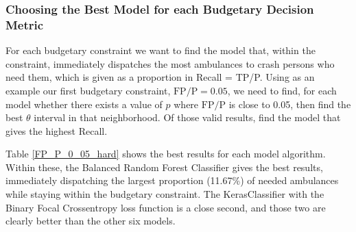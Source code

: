 \begin{comment}
Method 2:  This method is worked out in the 

\verb|RFC_Hard_0_Slices_Find_theta_Budget_Criterion_3.csv| file in the \verb|/Analysis_Spreadsheets/| folder.  

The Random Forest Classifier on the Hard features returns 458,530 unique values of $p$ with between 1 and 83 samples per value of $p$.  For each value of $p$ we know how many samples are in the Neg and Pos classes.  Order the $p$ values increasing.  For each value of $p$, make an interval with the thousand nearest values of $p$ (500 above and 500 below), and find the total number of elements of the positive and negative classes in that neighborhood.  Using those Neg and Pos values, calculate  $\text{Pos}/(\text{Neg}+\text{Pos})$ for each $p$.  Then see whether there is a small interval where $\text{Pos}/(\text{Neg}+\text{Pos}) \approx 0.50$.  We chose ``within 0.001'' to mean ``approximately.''

The first value of $p$ with $|\text{Pos}/(\text{Neg}+\text{Pos}) - 0.50| < 0.001$ was at $p=0.271584$, and the last at $p = 0.27174$.  In that range of 49 values of $p$, 21 of them satisfied the criterion.  Given those results, it is reasonable to say that $\theta \approx 0.272$ satisfies the criterion.  
\end{comment}

\subsubsection{Choosing the Best Model for each Budgetary Decision Metric}
\label{choosing_model}

For each budgetary constraint we want to find the model that, within the constraint, immediately dispatches the most ambulances to crash persons who need them, which is given as a proportion in Recall = TP/P.  Using as an example our first budgetary constraint, $\text{FP}/\text{P} = 0.05$, we need to find, for each model whether there exists a value of $p$ where $\text{FP}/\text{P}$ is close to 0.05, then find the best $\theta$ interval in that neighborhood.  Of those valid results, find the model that gives the highest Recall.  

Table \ref{FP_P_0_05_hard} shows the best results for each model algorithm.  Within these, the Balanced Random Forest Classifier gives the best results, immediately dispatching the largest proportion (11.67\%) of needed ambulances while staying within the budgetary constraint.  The KerasClassifier with the Binary Focal Crossentropy loss function is a close second, and those two are clearly better than the other six models.  

